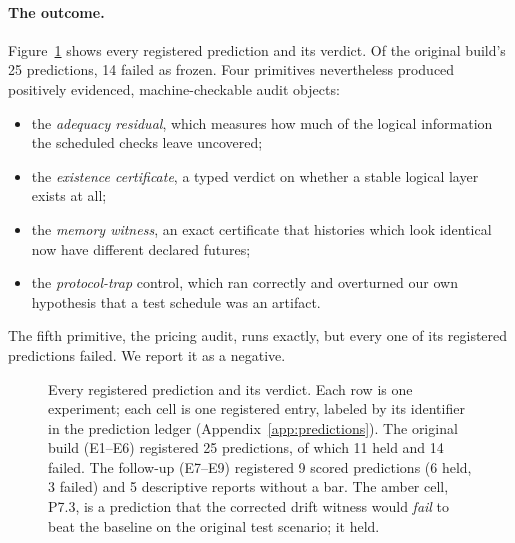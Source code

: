 \paragraph{The outcome.} Figure~\ref{fig:verdicts} shows every registered prediction and its verdict. Of the original build's 25 predictions, 14 failed as frozen. %
Four primitives nevertheless produced positively evidenced, machine-checkable audit objects: %
\begin{itemize}[nosep]
\item the \emph{adequacy residual}, which measures how much of the logical information the scheduled checks leave uncovered;
\item the \emph{existence certificate}, a typed verdict on whether a stable logical layer exists at all;
\item the \emph{memory witness}, an exact certificate that histories which look identical now have different declared futures;
\item the \emph{protocol-trap} control, which ran correctly and overturned our own hypothesis that a test schedule was an artifact.
\end{itemize}
The fifth primitive, the pricing audit, runs exactly, but every one of its registered predictions failed. We report it as a negative. %

\begin{figure}[tbp]
\centering

\caption{Every registered prediction and its verdict. Each row is one experiment; each cell is one registered entry, labeled by its identifier in the prediction ledger (Appendix~\ref{app:predictions}). The original build (E1--E6) registered 25 predictions, of which 11 held and 14 failed. The follow-up (E7--E9) registered 9 scored predictions (6 held, 3 failed) and 5 descriptive reports without a bar. The amber cell, P7.3, is a prediction that the corrected drift witness would \emph{fail} to beat the baseline on the original test scenario; it held.}%
\label{fig:verdicts}
\end{figure}

